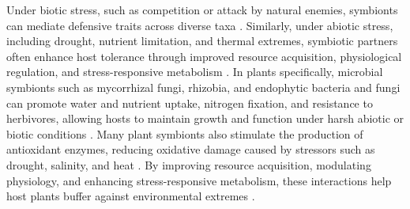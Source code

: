 \documentclass[12pt]{article}\usepackage[]{graphicx}\usepackage[dvipsnames]{xcolor}
\begin{document}
Under biotic stress, such as competition or attack by natural enemies, symbionts can mediate defensive traits across diverse taxa \citep{atala2022fungal,bastias2017epichloe,vega2008insect,haine2008symbiont,florez2015defensive}.
Similarly, under abiotic stress, including drought, nutrient limitation, and thermal extremes, symbiotic partners often enhance host tolerance through improved resource acquisition, physiological regulation, and stress-responsive metabolism \citep{clay2002evolutionary, afkhami2008symbiosis,cesar2024defensive}. 
In plants specifically, microbial symbionts such as mycorrhizal fungi, rhizobia, and endophytic bacteria and fungi can promote water and nutrient uptake, nitrogen fixation, and resistance to herbivores, allowing hosts to maintain growth and function under harsh abiotic or biotic conditions \citep{amijee1989development, friesen2011microbially,van2015mycorrhizal}.
Many plant symbionts also stimulate the production of antioxidant enzymes, reducing oxidative damage caused by stressors such as drought, salinity, and heat \citep{ruiz1996superoxide}. 
By improving resource acquisition, modulating physiology, and enhancing stress-responsive metabolism, these interactions help host plants buffer against environmental extremes \citep{fowler2023geographic,rudgers2020climate,li2026climate}.
\end{document}
